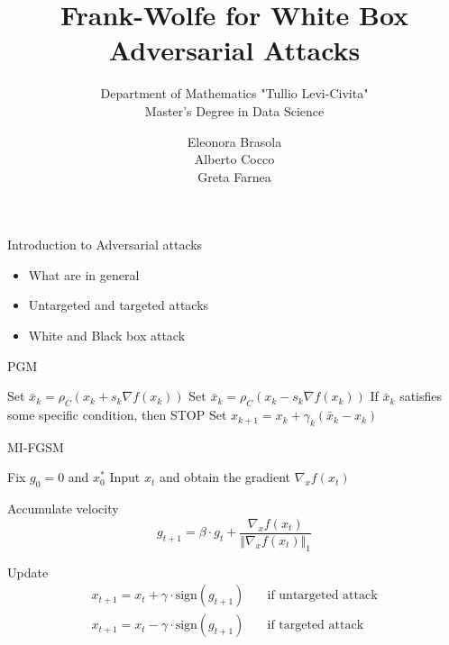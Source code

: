 \documentclass{beamer}
\title{Frank-Wolfe for White Box Adversarial Attacks}
\subtitle{\normalsize Department of Mathematics "Tullio Levi-Civita"\\
Master's Degree in Data Science}
\author[Greta Farnea]{\large Eleonora Brasola \\ Alberto Cocco \\ Greta Farnea}
\date{\vspace{.5cm} \;}
\institute[]{Università di Padova}
\theoremstyle{plain}
\theoremstyle{definition}
\begin{document}
\begin{frame}
\maketitle
\end{frame}

\begin{frame}{Introduction to Adversarial attacks}
    \begin{itemize}
        \item What are in general 
        \item Untargeted and targeted attacks 
        \item White and Black box attack
    \end{itemize}
\end{frame}

\begin{frame}{PGM}
    \begin{algorithm}[H]
\caption{PGM}\label{PGD}
\begin{algorithmic}[1]
  \State Set $ \bar{x}_k = \rho_C(x_k + s_k \nabla f(x_k))$ 
  \State Set $ \bar{x}_k = \rho_C(x_k - s_k \nabla f(x_k))$ 
  \State If $\bar{x}_k$ satisfies some specific condition, then STOP
  \State Set $x_{k+1} = x_k + \gamma_k (\bar{x}_k - x_k)$ \Comment{with $\gamma_k \in (0, 1]$}
    
\EndFor
\end{algorithmic}
\end{algorithm}
\end{frame}

\begin{frame}{MI-FGSM}
    \begin{algorithm}[H]
\caption{MI-FGSM}\label{MI_FGSM}
\begin{algorithmic}[1]

\State Fix $g_0 = 0$ and $x_{0}^\ast$ %
    \State Input $x_t$ and obtain the gradient $\nabla_x f(x_t)$

    \State Accumulate velocity \begin{equation*}
        g_{t+1} = \beta \cdot g_t + \frac{\nabla_x f(x_t)}{\Vert \nabla_x f(x_t) \Vert_1}
    \end{equation*}
    
    \State Update \begin{align*}
        x_{t+1} = x_t + \gamma \cdot \text{sign} (g_{t+1}) \quad &\text{if untargeted attack}\\ 
        x_{t+1} = x_t - \gamma \cdot \text{sign} (g_{t+1}) \quad &\text{if targeted attack}
    \end{align*}
    
\EndFor
\end{algorithmic}
\end{algorithm}
\end{frame}
\end{document}

